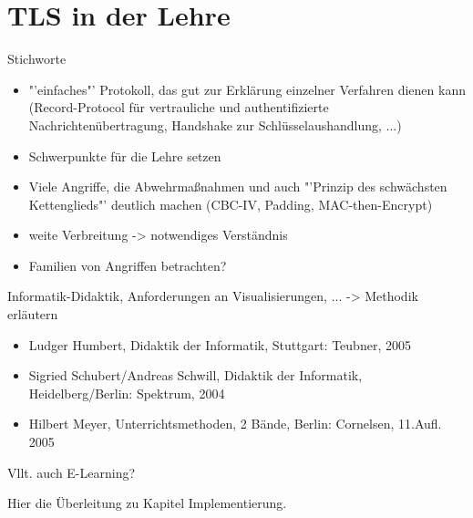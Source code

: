 \chapter{TLS in der Lehre}

Stichworte

\begin{itemize}
	\item "'einfaches"' Protokoll, das gut zur Erklärung einzelner Verfahren dienen kann (Record-Protocol für vertrauliche und authentifizierte Nachrichtenübertragung, Handshake zur Schlüsselaushandlung, ...)
	\item Schwerpunkte für die Lehre setzen
	\item Viele Angriffe, die Abwehrmaßnahmen und auch "'Prinzip des schwächsten Kettenglieds"' deutlich machen (CBC-IV, Padding, MAC-then-Encrypt)
	\item weite Verbreitung -> notwendiges Verständnis
	\item Familien von Angriffen betrachten?
\end{itemize}

Informatik-Didaktik, Anforderungen an Visualisierungen, ... -> Methodik erläutern

\begin{itemize}
\item Ludger Humbert, Didaktik der Informatik, Stuttgart: Teubner, 2005
\item Sigried Schubert/Andreas Schwill, Didaktik der Informatik, Heidelberg/Berlin: Spektrum, 2004
\item Hilbert Meyer, Unterrichtsmethoden, 2 Bände, Berlin: Cornelsen, 11.Aufl. 2005
\end{itemize}

Vllt. auch E-Learning?

Hier die Überleitung zu Kapitel Implementierung. 